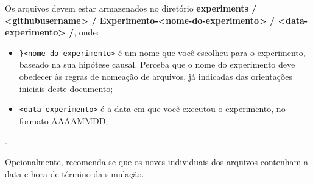 Os arquivos devem estar armazenados no diretório 
\textbf{experiments / <githubusername>
/ Experimento-<nome-do-experimento> / <data-experimento> /}, onde:
\begin{itemize}
    \item \verb|}<nome-do-experimento>| é um nome que você escolheu para o experimento, baseado na sua hipótese causal. Perceba que o nome do experimento deve obedecer às regras de nomeação de arquivos, já indicadas das orientações iniciais deste documento;
    \item \verb|<data-experimento>| é a data em que você executou o experimento, no formato AAAAMMDD;
\end{itemize}.

Opcionalmente, recomenda-se que os noves individuais dos arquivos contenham a data e hora de término da simulação.



